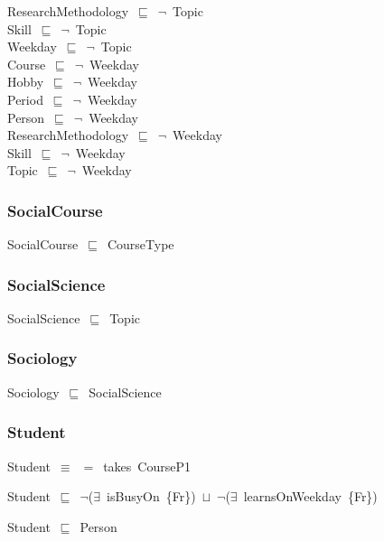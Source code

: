 \documentclass{article}
\begin{document}
ResearchMethodology~\ensuremath{\sqsubseteq}~\ensuremath{\lnot}~Topic\\
Skill~\ensuremath{\sqsubseteq}~\ensuremath{\lnot}~Topic\\
Weekday~\ensuremath{\sqsubseteq}~\ensuremath{\lnot}~Topic\\
Course~\ensuremath{\sqsubseteq}~\ensuremath{\lnot}~Weekday\\
Hobby~\ensuremath{\sqsubseteq}~\ensuremath{\lnot}~Weekday\\
Period~\ensuremath{\sqsubseteq}~\ensuremath{\lnot}~Weekday\\
Person~\ensuremath{\sqsubseteq}~\ensuremath{\lnot}~Weekday\\
ResearchMethodology~\ensuremath{\sqsubseteq}~\ensuremath{\lnot}~Weekday\\
Skill~\ensuremath{\sqsubseteq}~\ensuremath{\lnot}~Weekday\\
Topic~\ensuremath{\sqsubseteq}~\ensuremath{\lnot}~Weekday\\


\subsubsection*{SocialCourse}

SocialCourse~\ensuremath{\sqsubseteq}~CourseType~

\subsubsection*{SocialScience}

SocialScience~\ensuremath{\sqsubseteq}~Topic~

\subsubsection*{Sociology}

Sociology~\ensuremath{\sqsubseteq}~SocialScience~

\subsubsection*{Student}

Student~\ensuremath{\equiv}~\ensuremath{=}~takes~CourseP1

Student~\ensuremath{\sqsubseteq}~\ensuremath{\lnot}(\ensuremath{\exists}~isBusyOn~\{Fr\})~\ensuremath{\sqcup}~\ensuremath{\lnot}(\ensuremath{\exists}~learnsOnWeekday~\{Fr\})~

Student~\ensuremath{\sqsubseteq}~Person~
\end{document}
